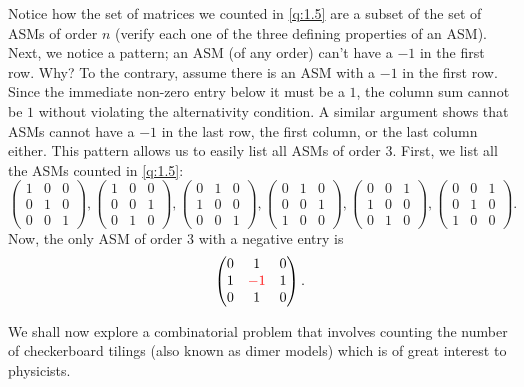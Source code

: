 \begin{solution}
Notice how the set of matrices we counted in \cref{q:1.5} are a subset of the set of ASMs of order $n$ (verify each one of the three defining properties of an ASM). Next, we notice a pattern; an ASM (of any order) can't have a $-1$ in the first row. Why? To the contrary, assume there is an ASM with a $-1$ in the first row. Since the immediate non-zero entry below it must be a $1$, the column sum cannot be $1$ without violating the alternativity condition. A similar argument shows that ASMs cannot have a 
$-1$ in the last row, the first column, or the last column either. This pattern allows us to easily list all ASMs of order $3$.
First, we list all the ASMs counted in \cref{q:1.5}:
\[
\begin{pmatrix}
    1 & 0 & 0 \\
    0 & 1 & 0 \\
    0 & 0 & 1
\end{pmatrix},
\begin{pmatrix}
    1 & 0 & 0 \\
    0 & 0 & 1 \\
    0 & 1 & 0
\end{pmatrix},
\begin{pmatrix}
    0 & 1 & 0 \\
    1 & 0 & 0 \\
    0 & 0 & 1
\end{pmatrix},
\begin{pmatrix}
    0 & 1 & 0 \\
    0 & 0 & 1 \\
    1 & 0 & 0
\end{pmatrix},
\begin{pmatrix}
    0 & 0 & 1 \\
    1 & 0 & 0 \\
    0 & 1 & 0
\end{pmatrix},
\begin{pmatrix}
    0 & 0 & 1 \\
    0 & 1 & 0 \\
    1 & 0 & 0
\end{pmatrix}.
\]
Now, the only ASM of order $3$ with a negative entry is
\[
\begin{pmatrix}
    0 & 1 & 0 \\
    1 & \textcolor{red}{-1} & 1 \\
    0 & 1 & 0
\end{pmatrix}.
\]
\end{solution}
We shall now explore a combinatorial problem that involves counting the number of checkerboard tilings (also known as dimer models) which is of great interest to physicists. 

